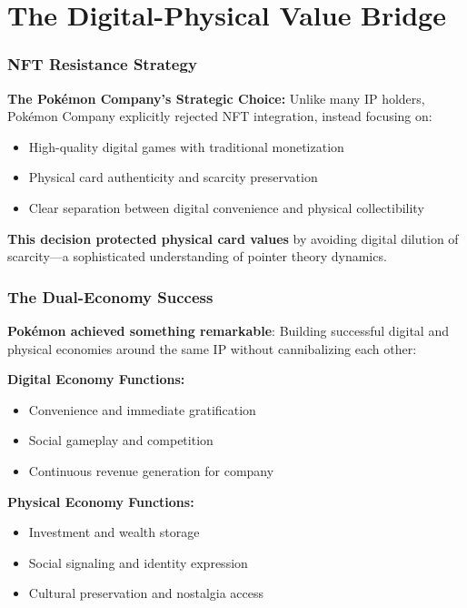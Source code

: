 \documentclass[11pt,oneside]{book}
\begin{document}
{{{{{{\section{The Digital-Physical Value Bridge}

\subsubsection{NFT Resistance Strategy}

\textbf{The Pokémon Company's Strategic Choice:}
Unlike many IP holders, Pokémon Company explicitly rejected NFT integration, instead focusing on:
\begin{itemize}
\item High-quality digital games with traditional monetization
\item Physical card authenticity and scarcity preservation
\item Clear separation between digital convenience and physical collectibility
\end{itemize}

\textbf{This decision protected physical card values} by avoiding digital dilution of scarcity—a sophisticated understanding of pointer theory dynamics.

\subsubsection{The Dual-Economy Success}

\textbf{Pokémon achieved something remarkable}: Building successful digital and physical economies around the same IP without cannibalizing each other:

\textbf{Digital Economy Functions:}
\begin{itemize}
\item Convenience and immediate gratification
\item Social gameplay and competition
\item Continuous revenue generation for company
\end{itemize}

\textbf{Physical Economy Functions:}
\begin{itemize}
\item Investment and wealth storage
\item Social signaling and identity expression
\item Cultural preservation and nostalgia access
\end{itemize}

}}}}}}
\end{document}
